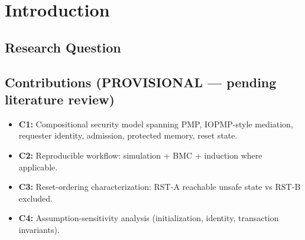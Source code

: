 \section{Introduction}
\label{sec:intro}



\subsection{Research Question}

\subsection{Contributions (PROVISIONAL --- pending literature review)}
\begin{itemize}
  \item \textbf{C1:} Compositional security model spanning PMP, IOPMP-style mediation, requester identity, admission, protected memory, reset state. %
  \item \textbf{C2:} Reproducible workflow: simulation + BMC + induction where applicable. %
  \item \textbf{C3:} Reset-ordering characterization: RST-A reachable unsafe state vs RST-B excluded. %
  \item \textbf{C4:} Assumption-sensitivity analysis (initialization, identity, transaction invariants). %
\end{itemize}

